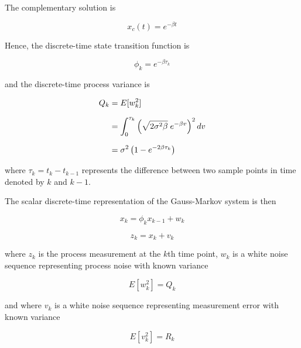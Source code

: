 \documentclass[12pt]{article}
\begin{document}
The complementary solution is

\begin{equation}
    x_c(t) = e^{-\beta t}
    \label{eq:GM-complementary-solution}
\end{equation}

Hence, the discrete-time state transition function is

\begin{equation}
    \phi_k = e^{-\beta \tau_k}
    \label{eq:GM-state-transition}
\end{equation}

and the discrete-time process variance is

\begin{equation}
    \setlength{\jot}{10pt}
    \begin{aligned}
    Q_k &= E[w_k^2] \\
        &= \int_0^{\tau_k} \left ( \sqrt{2 \sigma^2 \beta} \; e^{- \beta v} \right ) ^ 2 dv \\
        &= \sigma^2 \left ( 1 - e^{-2 \beta \tau_k} \right )
    \end{aligned}
    \label{eq:GM-process-variance}
\end{equation}

where $\tau_k = t_k - t_{k-1}$ represents the difference between two sample points in time
denoted by $k$ and $k - 1$.

The scalar discrete-time representation of the Gauss-Markov system is then

\begin{equation}
    x_k = \phi_k x_{k-1} + w_k
    \label{eq:GM-discrete-state-equation}
\end{equation}

\begin{equation}
    z_k = x_{k} + v_k
    \label{eq:GM-discrete-measurement-equation}
\end{equation}

where $z_k$ is the process measurement at the $k$th time point, $w_k$ is a white noise
sequence representing process noise with known variance

\begin{equation}
    E[w_k^2] = Q_k
    \label{eq:GM-discrete-process-variance}
\end{equation}

and where $v_k$ is a white noise sequence representing measurement error with known
variance

\begin{equation}
    E[v_k^2] = R_k
    \label{eq:GM-discrete-measurement-variance}
\end{equation}
\end{document}
